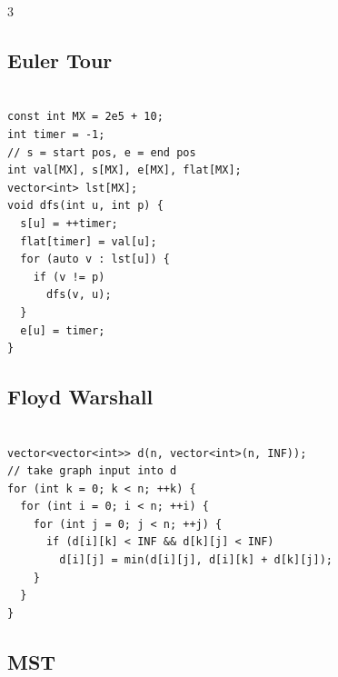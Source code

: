 \documentclass[10pt, landscape, a4paper, onesided]{extarticle}
\begin{document}
\begin{multicols*}{3}
\subsection{Euler Tour}
\begin{verbatim}

const int MX = 2e5 + 10;
int timer = -1;
// s = start pos, e = end pos
int val[MX], s[MX], e[MX], flat[MX];
vector<int> lst[MX];
void dfs(int u, int p) {
  s[u] = ++timer;
  flat[timer] = val[u];
  for (auto v : lst[u]) {
    if (v != p)
      dfs(v, u);
  }
  e[u] = timer;
}
\end{verbatim}

\subsection{Floyd Warshall}
\begin{verbatim}

vector<vector<int>> d(n, vector<int>(n, INF));
// take graph input into d
for (int k = 0; k < n; ++k) {
  for (int i = 0; i < n; ++i) {
    for (int j = 0; j < n; ++j) {
      if (d[i][k] < INF && d[k][j] < INF)
        d[i][j] = min(d[i][j], d[i][k] + d[k][j]);
    }
  }
}
\end{verbatim}

\subsection{MST}
\begin{verbatim}


\end{verbatim}
\end{multicols*}
\end{document}
